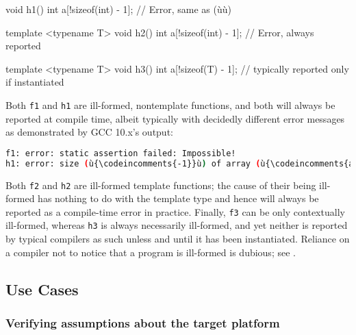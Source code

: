 \begin{emcppslisting}
void h1()
{
    int a[!sizeof(int) - 1];  // Error, same as (ù{}ù)
}

template <typename T>
void h2()
{
    int a[!sizeof(int) - 1];  // Error, always reported
}

template <typename T>
void h3()
{
    int a[!sizeof(T) - 1];    // typically reported only if instantiated
}
\end{emcppslisting}

\noindent Both \lstinline!f1! and \lstinline!h1! are ill-formed, nontemplate functions,
and both will always be reported at compile time, albeit typically with
decidedly different error messages as demonstrated by GCC 10.x's output:

\begin{lstlisting}[language=bash]
f1: error: static assertion failed: Impossible!
h1: error: size (ù{\codeincomments{-1}}ù) of array (ù{\codeincomments{a}}ù) is negative
\end{lstlisting}

\noindent Both \lstinline!f2! and \lstinline!h2! are ill-formed template functions; the cause of their being ill-formed has nothing to do with the
template type and hence will always be reported as a compile-time error
in practice. Finally, \lstinline!f3! can be only contextually ill-formed,
whereas \lstinline!h3! is always necessarily ill-formed, and yet neither is
reported by typical compilers as such unless and until it has been
instantiated. Reliance on a compiler not to notice that a program is
ill-formed is dubious; see
.

\subsection[Use Cases]{Use Cases}\label{use-cases}

\subsubsection[Verifying assumptions about the target platform]{Verifying assumptions about the target platform}\label{verifying-assumptions-about-the-target-platform}

